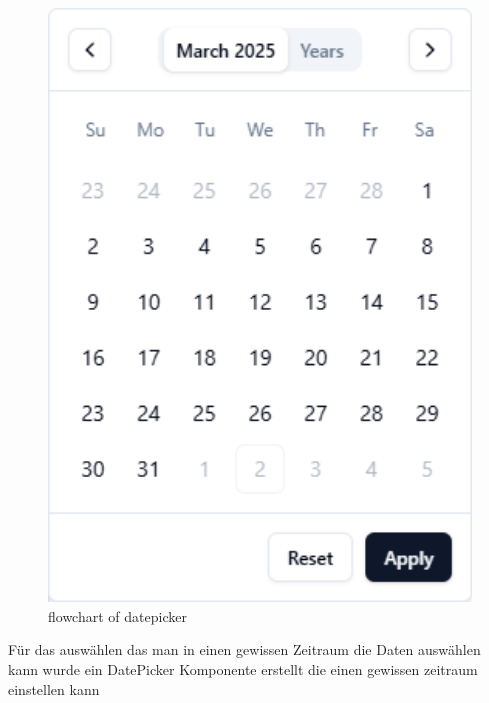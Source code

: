 \begin{inhalt}
\begin{enumerate}[label=\textbf{\arabic*.}]
\begin{figure}[!htb]
\centering
\includegraphics[width=1\textwidth]{files/Thomas/pics/Website/dashbord/dashbaord-datepicker.png}
\caption[Bildbezeichnung für Abbildungsverzeichnis]{flowchart of datepicker}
\label{fig:gehaeuse_internet_bild}
\end{figure}


Für das auswählen das man in einen gewissen Zeitraum die Daten auswählen kann wurde ein DatePicker Komponente erstellt die einen gewissen zeitraum einstellen kann



\end{enumerate}
\end{inhalt}

